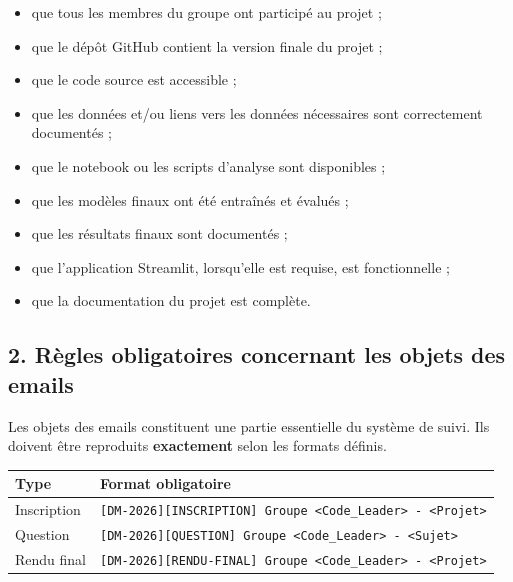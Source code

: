 \documentclass[11pt,a4paper]{article}
\begin{document}
\begin{tcolorbox}[
    colback=sintefblue!8,
    colframe=sintefblue,
    title=\textbf{DIRECTIVES OFFICIELLES DE COMMUNICATION, DE SUIVI ET DE RENDU},
    arc=2mm,
    boxrule=0.8pt,
    breakable
]
\begin{enumerate}[leftmargin=*]
    \begin{itemize}
        \item que tous les membres du groupe ont participé au projet ;
        \item que le dépôt GitHub contient la version finale du projet ;
        \item que le code source est accessible ;
        \item que les données et/ou liens vers les données nécessaires sont
              correctement documentés ;
        \item que le notebook ou les scripts d'analyse sont disponibles ;
        \item que les modèles finaux ont été entraînés et évalués ;
        \item que les résultats finaux sont documentés ;
        \item que l'application Streamlit, lorsqu'elle est requise, est
              fonctionnelle ;
        \item que la documentation du projet est complète.
    \end{itemize}

\end{enumerate}

\subsection*{2. Règles obligatoires concernant les objets des emails}

Les objets des emails constituent une partie essentielle du système de suivi.
Ils doivent être reproduits \textbf{exactement} selon les formats définis.

\begin{center}
\begin{tabular}{|p{3.2cm}|p{9cm}|}
\hline
\textbf{Type} & \textbf{Format obligatoire} \\
\hline
Inscription &
\texttt{[DM-2026][INSCRIPTION] Groupe <Code\_Leader> - <Projet>} \\
\hline
Question &
\texttt{[DM-2026][QUESTION] Groupe <Code\_Leader> - <Sujet>} \\
\hline
Rendu final &
\texttt{[DM-2026][RENDU-FINAL] Groupe <Code\_Leader> - <Projet>} \\
\hline
\end{tabular}
\end{center}


\end{tcolorbox}
\end{document}
